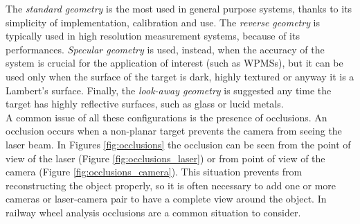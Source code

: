 The \textit{standard geometry} is the most used in general purpose systems, thanks to its simplicity of implementation, calibration and use. The \textit{reverse geometry} is typically used in high resolution measurement systems, because of its performances. \textit{Specular geometry} is used, instead, when the accuracy of the system is crucial for the application of interest (such as \acs{WPMS}s), but it can be used only when the surface of the target is dark, highly textured or anyway it is a Lambert's surface. Finally, the \textit{look-away geometry} is suggested any time the target has highly reflective surfaces, such as glass or lucid metals. \\

A common issue of all these configurations is the presence of occlusions. An occlusion occurs when a non-planar target prevents the camera from seeing the laser beam. In Figures \ref{fig:occlusions} the occlusion can be seen from the point of view of the laser (Figure \ref{fig:occlusions_laser}) or from point of view of the camera (Figure \ref{fig:occlusions_camera}). This situation prevents from reconstructing the object properly, so it is often necessary to add one or more cameras or laser-camera pair to have a complete view around the object. In railway wheel analysis occlusions are a common situation to consider.

